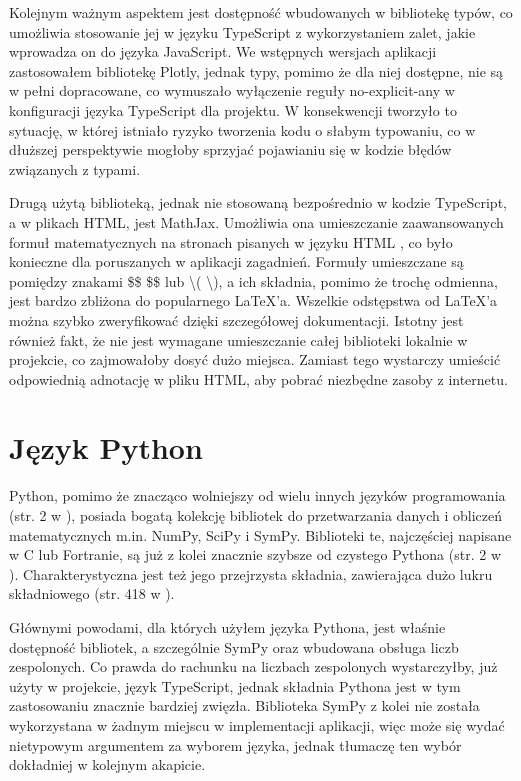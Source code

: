 \documentclass{SGGW-thesis}
\begin{document}
	Kolejnym ważnym aspektem jest dostępność wbudowanych w bibliotekę typów, co umożliwia stosowanie jej w języku TypeScript z wykorzystaniem zalet, jakie wprowadza on do języka JavaScript. We wstępnych wersjach aplikacji zastosowałem bibliotekę Plotly, jednak typy, pomimo że dla niej dostępne, nie są w pełni dopracowane, co wymuszało wyłączenie reguły no-explicit-any w konfiguracji języka TypeScript dla projektu. W konsekwencji tworzyło to sytuację, w której istniało ryzyko tworzenia kodu o słabym typowaniu, co w dłuższej perspektywie mogłoby sprzyjać pojawianiu się w kodzie błędów związanych z typami.
	
	Drugą użytą biblioteką, jednak nie stosowaną bezpośrednio w kodzie TypeScript, a w plikach HTML, jest MathJax. Umożliwia ona umieszczanie zaawansowanych formuł matematycznych na stronach pisanych w języku HTML \cite{mathjax}, co było konieczne dla poruszanych w aplikacji zagadnień. Formuły umieszczane są pomiędzy znakami \$\$ \$\$ lub \textbackslash( \textbackslash), a ich składnia, pomimo że trochę odmienna, jest bardzo zbliżona do popularnego LaTeX'a. Wszelkie odstępstwa od LaTeX'a można szybko zweryfikować dzięki szczegółowej dokumentacji. Istotny jest również fakt, że nie jest wymagane umieszczanie całej biblioteki lokalnie w projekcie, co zajmowałoby dosyć dużo miejsca. Zamiast tego wystarczy umieścić odpowiednią adnotację w pliku HTML, aby pobrać niezbędne zasoby z internetu.
	
	\section{Język Python}
	Python, pomimo że znacząco wolniejszy od wielu innych języków programowania (str. 2 w  \cite{Python}), posiada bogatą kolekcję bibliotek do przetwarzania danych i obliczeń matematycznych m.in. NumPy, SciPy i SymPy. Biblioteki te, najczęściej napisane w C lub Fortranie, są już z kolei znacznie szybsze od czystego Pythona (str. 2 w \cite{Python}). Charakterystyczna jest też jego przejrzysta składnia, zawierająca dużo lukru składniowego (str. 418 w \cite{Python}).
	
	Głównymi powodami, dla których użyłem języka Pythona, jest właśnie dostępność bibliotek, a szczególnie SymPy oraz wbudowana obsługa liczb zespolonych. Co prawda do rachunku na liczbach zespolonych wystarczyłby, już użyty w projekcie, język TypeScript, jednak składnia Pythona jest w tym zastosowaniu znacznie bardziej zwięzła. Biblioteka SymPy z kolei nie została wykorzystana w żadnym miejscu w implementacji aplikacji, więc może się wydać nietypowym argumentem za wyborem języka, jednak tłumaczę ten wybór dokładniej w kolejnym akapicie. 
	
\end{document}
